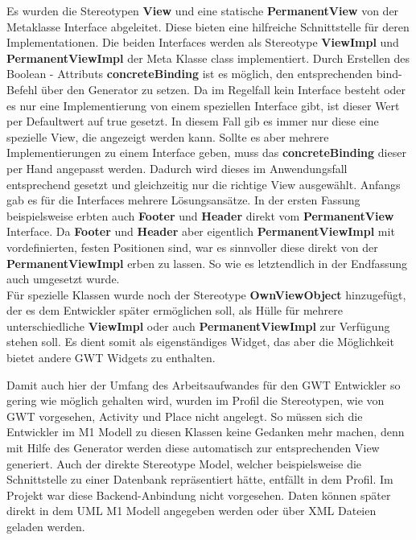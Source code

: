Es wurden die Stereotypen  \textbf{View} und eine statische  \textbf{PermanentView} von der Metaklasse Interface abgeleitet. Diese bieten eine hilfreiche Schnittstelle für deren Implementationen. Die beiden Interfaces werden als Stereotype  \textbf{ViewImpl} und  \textbf{PermanentViewImpl} der Meta Klasse class implementiert. Durch Erstellen des Boolean - Attributs \textbf{concreteBinding} ist es möglich, den entsprechenden bind-Befehl über den Generator zu setzen. Da im Regelfall kein Interface besteht oder es nur eine Implementierung von einem speziellen Interface gibt, ist dieser Wert per Defaultwert auf true gesetzt. In diesem Fall gib es immer nur diese eine spezielle View, die angezeigt werden kann. Sollte es aber mehrere Implementierungen zu einem Interface geben, muss das  \textbf{concreteBinding}  dieser per Hand angepasst werden. Dadurch wird dieses im Anwendungsfall entsprechend gesetzt und gleichzeitig nur die richtige View ausgewählt.
Anfangs gab es für die Interfaces mehrere Lösungsansätze. In der ersten Fassung beispielsweise erbten auch  \textbf{Footer}  und  \textbf{Header}  direkt vom \textbf{PermanentView} Interface. Da  \textbf{Footer} und  \textbf{Header} aber eigentlich \textbf{PermanentViewImpl} mit vordefinierten, festen Positionen sind, war es sinnvoller diese direkt von der \textbf{PermanentViewImpl} erben zu lassen. So wie es letztendlich in der Endfassung auch umgesetzt wurde.  \\

Für spezielle Klassen wurde noch der Stereotype \textbf{OwnViewObject} hinzugefügt, der es dem Entwickler später ermöglichen soll, als Hülle für mehrere unterschiedliche \textbf{ViewImpl} oder auch \textbf{PermanentViewImpl} zur Verfügung stehen soll. Es dient somit als eigenständiges Widget, das aber die Möglichkeit bietet andere GWT Widgets zu enthalten.

Damit auch hier der Umfang des Arbeitsaufwandes für den GWT Entwickler so gering wie möglich gehalten wird, wurden im Profil die Stereotypen, wie von GWT vorgesehen, Activity und Place nicht angelegt. So müssen sich die Entwickler im M1 Modell zu diesen Klassen keine Gedanken mehr machen, denn mit Hilfe des Generator werden diese automatisch zur entsprechenden View generiert. 
Auch der direkte Stereotype Model, welcher beispielsweise die Schnittstelle zu einer Datenbank repräsentiert hätte, entfällt in dem Profil. Im Projekt war diese Backend-Anbindung nicht vorgesehen. Daten können später direkt in dem UML M1 Modell angegeben werden oder über XML Dateien geladen werden.